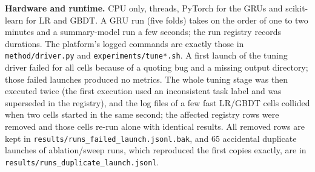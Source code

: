 \textbf{Hardware and runtime.} CPU only,  threads, PyTorch for the GRUs and scikit-learn for LR and GBDT. A GRU run (five folds) takes on the order of one to two minutes and a summary-model run a few seconds; the run registry records durations. The platform's logged commands are exactly those in \texttt{method/driver.py} and \texttt{experiments/tune*.sh}. A first launch of the tuning driver failed for all cells because of a quoting bug and a missing output directory; those failed launches produced no metrics. The whole tuning stage was then executed twice (the first execution used an inconsistent task label and was superseded in the registry), and the log files of a few fast LR/GBDT cells collided when two cells started in the same second; the affected registry rows were removed and those cells re-run alone with identical results. All removed rows are kept in \texttt{results/runs\_failed\_launch.jsonl.bak}, and 65 accidental duplicate launches of ablation/sweep runs, which reproduced the first copies exactly, are in \texttt{results/runs\_duplicate\_launch.jsonl}.
